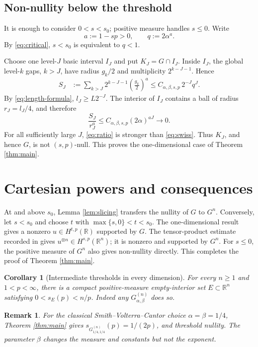 \documentclass[11pt]{article}
\newtheorem{corollary}[theorem]{Corollary}
\newtheorem{remark}[theorem]{Remark}
\newcommand{\R}{\mathbb R}
\begin{document}
\subsection*{Non-nullity below the threshold}

It is enough to consider $0<s<s_0$; positive measure handles $s\leq0$.
Write
\[
 a:=1-sp>0,\qquad q:=2\alpha^a.
\]
By \eqref{eq:critical}, $s<s_0$ is equivalent to $q<1$.

Choose one level-$J$ basic interval $I_J$ and put $K_J=G\cap I_J$.
Inside $I_J$, the global level-$k$ gaps, $k>J$, have radius $g_k/2$ and
multiplicity $2^{k-J-1}$.  Hence
\begin{align}\label{eq:tail}
 S_J&:=\sum_{k>J}2^{k-J-1}\left(\frac{g_k}{2}\right)^a
 \leq C_{\alpha,\beta,s,p}\,2^{-J}q^J.
\end{align}
By \eqref{eq:length-formula}, $l_J\geq L2^{-J}$.  The interior of $I_J$
contains a ball of radius $r_J=l_J/4$, and therefore
\begin{equation}\label{eq:ratio}
 \frac{S_J}{r_J^a}
 \leq C_{\alpha,\beta,s,p}(2\alpha)^{aJ}\longrightarrow0.
\end{equation}
For all sufficiently large $J$, \eqref{eq:ratio} is stronger than
\eqref{eq:swiss}.  Thus $K_J$, and hence $G$, is not $(s,p)$-null.
This proves the one-dimensional case of Theorem \ref{thm:main}.

\section{Cartesian powers and consequences}

At and above $s_0$, Lemma \ref{lem:slicing} transfers the nullity of $G$
to $G^n$.  Conversely, let $s<s_0$ and choose $t$ with
$\max\{s,0\}<t<s_0$.  The one-dimensional result gives a nonzero
$u\in H^{t,p}(\R)$ supported by $G$.  The tensor-product estimate recorded
in \cite[Proposition A.1]{HM} gives
$u^{\otimes n}\in H^{s,p}(\R^n)$; it is nonzero and supported by $G^n$.
For $s\leq0$, the positive measure of $G^n$ also gives non-nullity directly.
This completes the proof of Theorem \ref{thm:main}.

\begin{corollary}[Intermediate thresholds in every dimension]
For every $n\geq1$ and $1<p<\infty$, there is a compact positive-measure
empty-interior set $E\subset\R^n$ satisfying
$0<s_E(p)<n/p$.  Indeed any $G_{\alpha,\beta}^{(n)}$ does so.
\end{corollary}

\begin{remark}
For the classical Smith--Volterra--Cantor choice
$\alpha=\beta=1/4$, Theorem \ref{thm:main} gives
$s_{G_{1/4,1/4}^{(n)}}(p)=1/(2p)$, and threshold nullity.  The parameter
$\beta$ changes the measure and constants but not the exponent.
\end{remark}
\end{document}
